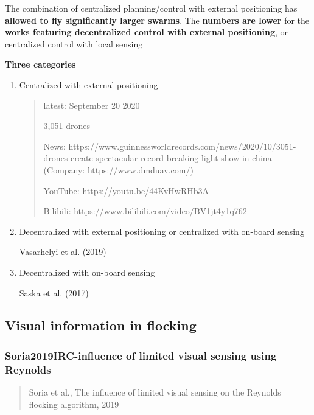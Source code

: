 \documentclass[]{article}
\begin{document}
The combination of centralized planning/control with external
positioning has \textbf{allowed to fly significantly larger swarms}. The
\textbf{numbers are lower} for the \textbf{works featuring decentralized
control with external positioning}, or centralized control with local
sensing

\textbf{Three categories}

\begin{enumerate}
\def\labelenumi{\arabic{enumi}.}
\item
  Centralized with external positioning

  \begin{quote}
  latest: September 20 2020

  3,051 drones

  News:
  https://www.guinnessworldrecords.com/news/2020/10/3051-drones-create-spectacular-record-breaking-light-show-in-china
  (Company: https://www.dmduav.com/)

  YouTube: https://youtu.be/44KvHwRHb3A

  Bilibili: https://www.bilibili.com/video/BV1jt4y1q762
  \end{quote}
\item
  Decentralized with external positioning or centralized with on-board
  sensing

  Vasarhelyi et al. (2019)
\item
  Decentralized with on-board sensing

  Saska et al. (2017)
\end{enumerate}

\subsection{Visual information in flocking}\label{header-n1461}

\subsubsection{Soria2019IRC-influence of limited visual sensing using
Reynolds}\label{header-n1462}

\begin{quote}
Soria et al., The influence of limited visual sensing on the Reynolds
ﬂocking algorithm, 2019
\end{quote}
\end{document}
